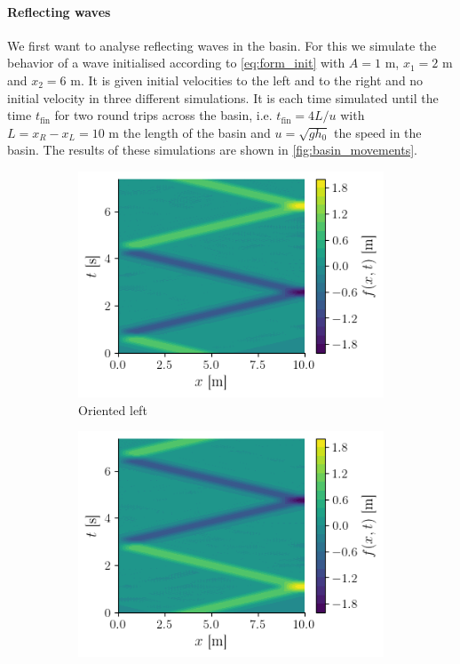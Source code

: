 \paragraph{Reflecting waves} We first want to analyse reflecting waves in the basin. For this we simulate the behavior of a wave initialised according to \autoref{eq:form_init} with $A = 1$ \si{\meter}, $x_1 = 2$ \si{\meter} and $x_2 = 6$ \si{\meter}. It is given initial velocities to the left and to the right and no initial velocity in three different simulations. It is each time simulated until the time $t_\mathrm{fin}$ for two round trips across the basin, i.e. $t_\mathrm{fin} = 4L/u$ with $L = x_R - x_L = 10$ \si{\meter} the length of the basin and $u = \sqrt{gh_0}$ the speed in the basin. The results of these simulations are shown in \autoref{fig:basin_movements}.
\begin{figure}[h]
    \centering
    \begin{subfigure}{0.48\linewidth}
        \includegraphics[width=\linewidth]{figures/bassin_default_left.png}
        \caption{Oriented left}
        \label{fig:basin_left}
    \end{subfigure}
    \begin{subfigure}{0.48\linewidth}
        \includegraphics[width=\linewidth]{figures/bassin_default_right.png}

\end{subfigure}
\end{figure}
